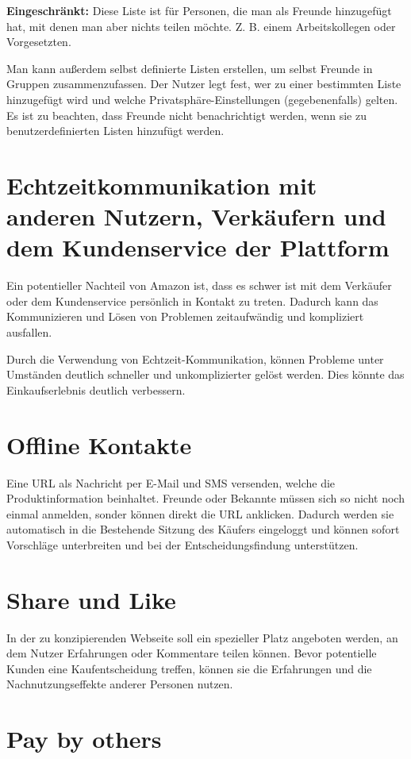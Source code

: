 \textbf{Eingeschränkt:} Diese Liste ist für Personen, die man als Freunde hinzugefügt hat, mit denen man aber nichts teilen möchte. Z. B. einem Arbeitskollegen oder Vorgesetzten.

Man kann außerdem selbst definierte Listen erstellen,  um selbst Freunde in Gruppen zusammenzufassen. Der Nutzer legt fest, wer zu einer bestimmten Liste hinzugefügt wird und welche Privatsphäre-Einstellungen (gegebenenfalls) gelten. Es ist zu beachten, dass Freunde nicht benachrichtigt werden, wenn sie zu benutzerdefinierten Listen hinzufügt werden.


\section{Echtzeitkommunikation mit anderen Nutzern, Verkäufern und dem Kundenservice der Plattform}

Ein potentieller Nachteil von Amazon ist, dass es schwer ist mit dem Verkäufer oder dem Kundenservice persönlich in Kontakt zu treten. Dadurch kann das Kommunizieren und Lösen von Problemen zeitaufwändig und kompliziert ausfallen.

Durch die Verwendung von Echtzeit-Kommunikation, können Probleme unter Umständen deutlich schneller und unkomplizierter gelöst werden. Dies könnte das Einkaufserlebnis deutlich verbessern.


\section{Offline Kontakte}

Eine URL als Nachricht per E-Mail und SMS versenden, welche die Produktinformation beinhaltet. Freunde oder Bekannte müssen sich so nicht noch einmal anmelden, sonder können direkt die URL anklicken. Dadurch werden sie automatisch in die Bestehende Sitzung des Käufers eingeloggt und können sofort Vorschläge unterbreiten und bei der Entscheidungsfindung unterstützen.


\section{Share und Like}

In der zu konzipierenden Webseite soll ein spezieller Platz angeboten werden, an dem Nutzer Erfahrungen oder Kommentare teilen können. Bevor potentielle Kunden eine Kaufentscheidung treffen, können sie die Erfahrungen und die Nachnutzungseffekte anderer Personen nutzen.


\section{Pay by others}

